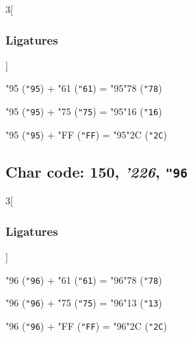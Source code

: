\documentclass{article}
\newlength{\maxcharwidth}
\begin{document}
\begin{multicols}{3}[\subsubsection{Ligatures}]

{\testfont\char"95\noboundary} ({\tt"95}) + {\testfont\char"61\noboundary} ({\tt"61}) = {\testfont\char"95\noboundary}{\testfont\char"78\noboundary} ({\tt"78}) 

{\testfont\char"95\noboundary} ({\tt"95}) + {\testfont\char"75\noboundary} ({\tt"75}) = {\testfont\char"95\noboundary}{\testfont\char"16\noboundary} ({\tt"16}) 

{\testfont\char"95\noboundary} ({\tt"95}) + {\testfont\char"FF\noboundary} ({\tt"FF}) = {\testfont\char"95\noboundary}{\testfont\char"2C\noboundary} ({\tt"2C}) 

\end{multicols}

\subsection{Char code: 150, {\it'226}, {\tt"96}}
\label{char_150}


\begin{multicols}{3}[\subsubsection{Ligatures}]

{\testfont\char"96\noboundary} ({\tt"96}) + {\testfont\char"61\noboundary} ({\tt"61}) = {\testfont\char"96\noboundary}{\testfont\char"78\noboundary} ({\tt"78}) 

{\testfont\char"96\noboundary} ({\tt"96}) + {\testfont\char"75\noboundary} ({\tt"75}) = {\testfont\char"96\noboundary}{\testfont\char"13\noboundary} ({\tt"13}) 

{\testfont\char"96\noboundary} ({\tt"96}) + {\testfont\char"FF\noboundary} ({\tt"FF}) = {\testfont\char"96\noboundary}{\testfont\char"2C\noboundary} ({\tt"2C}) 

\end{multicols}
\end{document}
